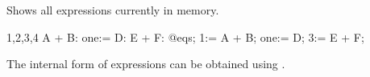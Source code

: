 
Shows all expressions currently in memory.
\begin{screen}{1,2,3,4}
A + B:
one:= D:
E + F:
@eqs;
1:= A + B;
one:= D;
3:= E + F;
\end{screen}
The internal form of expressions can be obtained using .



